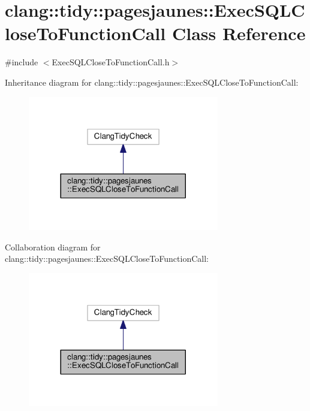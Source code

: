 \hypertarget{classclang_1_1tidy_1_1pagesjaunes_1_1_exec_s_q_l_close_to_function_call}{}\section{clang\+:\+:tidy\+:\+:pagesjaunes\+:\+:Exec\+S\+Q\+L\+Close\+To\+Function\+Call Class Reference}
\label{classclang_1_1tidy_1_1pagesjaunes_1_1_exec_s_q_l_close_to_function_call}


{\ttfamily \#include $<$Exec\+S\+Q\+L\+Close\+To\+Function\+Call.\+h$>$}



Inheritance diagram for clang\+:\+:tidy\+:\+:pagesjaunes\+:\+:Exec\+S\+Q\+L\+Close\+To\+Function\+Call\+:
\nopagebreak
\begin{figure}[H]
\begin{center}
\leavevmode
\includegraphics[width=236pt]{classclang_1_1tidy_1_1pagesjaunes_1_1_exec_s_q_l_close_to_function_call__inherit__graph}
\end{center}
\end{figure}


Collaboration diagram for clang\+:\+:tidy\+:\+:pagesjaunes\+:\+:Exec\+S\+Q\+L\+Close\+To\+Function\+Call\+:
\nopagebreak
\begin{figure}[H]
\begin{center}
\leavevmode
\includegraphics[width=236pt]{classclang_1_1tidy_1_1pagesjaunes_1_1_exec_s_q_l_close_to_function_call__coll__graph}
\end{center}
\end{figure}
